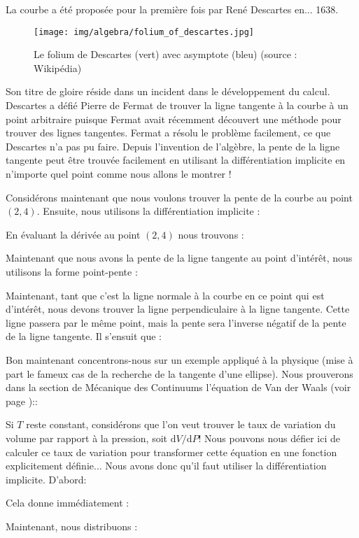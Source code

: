 	La courbe a été proposée pour la première fois par René Descartes en... 1638.
	\begin{figure}[H]
		\centering
			\texttt{[image: img/algebra/folium\_of\_descartes.jpg]}
		\caption[Le folium de Descartes avec asymptote]{Le folium de Descartes (vert) avec asymptote (bleu) (source : Wikipédia)}
	\end{figure}
	Son titre de gloire réside dans un incident dans le développement du calcul. Descartes a défié Pierre de Fermat de trouver la ligne tangente à la courbe à un point arbitraire puisque Fermat avait récemment découvert une méthode pour trouver des lignes tangentes. Fermat a résolu le problème facilement, ce que Descartes n'a pas pu faire. Depuis l'invention de l'algèbre, la pente de la ligne tangente peut être trouvée facilement en utilisant la différentiation implicite en n'importe quel point comme nous allons le montrer !
	
	Considérons maintenant que nous voulons trouver la pente de la courbe au point $(2,4)$. Ensuite, nous utilisons la différentiation implicite :
	
	En évaluant la dérivée au point $(2,4)$ nous trouvons :
	
	Maintenant que nous avons la pente de la ligne tangente au point d'intérêt, nous utilisons la forme point-pente :
	
	Maintenant, tant que c'est la ligne normale à la courbe en ce point qui est d'intérêt, nous devons trouver la ligne perpendiculaire à la ligne tangente. Cette ligne passera par le même point, mais la pente sera l'inverse négatif de la pente de la ligne tangente. Il s'ensuit que :
	
	Bon maintenant concentrons-nous sur un exemple appliqué à la physique (mise à part le fameux cas de la recherche de la tangente d'une ellipse). Nous prouverons dans la section de Mécanique des Continuums l'équation de Van der Waals (voir page \pageref{Van der Waals state equation})::
	
	Si $T$ reste constant, considérons que l'on veut trouver le taux de variation du volume par rapport à la pression, soit $\mathrm{d}V/\mathrm{d}P$! Nous pouvons nous défier ici de calculer ce taux de variation pour transformer cette équation en une fonction explicitement définie... Nous avons donc qu'il faut utiliser la différentiation implicite. D'abord:
	
	Cela donne immédiatement :
	
	Maintenant, nous distribuons :
	
